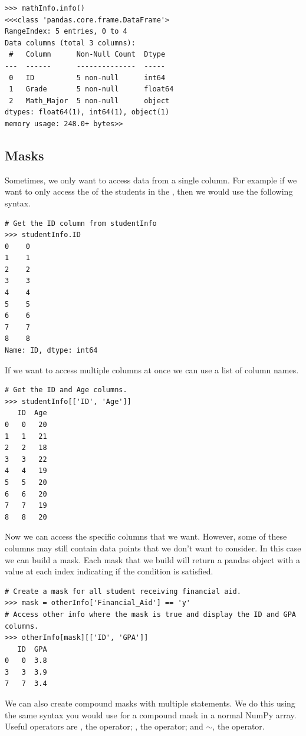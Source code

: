 \begin{lstlisting}
>>> mathInfo.info()
<<<class 'pandas.core.frame.DataFrame'>
RangeIndex: 5 entries, 0 to 4
Data columns (total 3 columns):
 #   Column      Non-Null Count  Dtype
---  ------      --------------  -----
 0   ID          5 non-null      int64
 1   Grade       5 non-null      float64
 2   Math_Major  5 non-null      object
dtypes: float64(1), int64(1), object(1)
memory usage: 248.0+ bytes>>
\end{lstlisting}

\subsection*{Masks}
Sometimes, we only want to access data from a single column.
For example if we want to only access the  of the students in the  , then we would use the following syntax.
\begin{lstlisting}
# Get the ID column from studentInfo
>>> studentInfo.ID
0    0
1    1
2    2
3    3
4    4
5    5
6    6
7    7
8    8
Name: ID, dtype: int64
\end{lstlisting}
If we want to access multiple columns at once we can use a list of column names.
\begin{lstlisting}
# Get the ID and Age columns.
>>> studentInfo[['ID', 'Age']]
   ID  Age
0   0   20
1   1   21
2   2   18
3   3   22
4   4   19
5   5   20
6   6   20
7   7   19
8   8   20
\end{lstlisting}

Now we can access the specific columns that we want.
However, some of these columns may still contain data points that we don't want to consider.
In this case we can build a mask.
Each mask that we build will return a pandas  object with a  value at each index indicating if the condition is satisfied.

\begin{lstlisting}
# Create a mask for all student receiving financial aid.
>>> mask = otherInfo['Financial_Aid'] == 'y'
# Access other info where the mask is true and display the ID and GPA columns.
>>> otherInfo[mask][['ID', 'GPA']]
   ID  GPA
0   0  3.8
3   3  3.9
7   7  3.4
\end{lstlisting}

We can also create compound masks with multiple statements.
We do this using the same syntax you would use for a compound mask in a normal NumPy array.
Useful operators are \li{&}, the  operator; \li{|}, the  operator; and $\sim$, the  operator.

